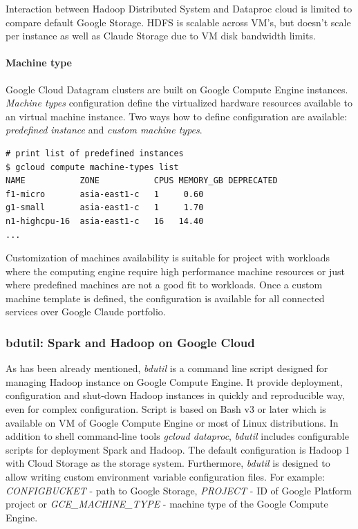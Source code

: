 \documentclass[a4paper,12pt,oneside]{report}
\begin{document}
Interaction between Hadoop Distributed System and Dataproc cloud is limited to compare default 
Google Storage. HDFS is scalable across VM’s, but doesn’t scale per instance as well as Claude Storage due to VM disk bandwidth limits. 

\paragraph{Machine type} Google Cloud Datagram clusters are built on Google Compute Engine instances.
\textit{Machine types} configuration define the virtualized hardware resources available to an 
virtual machine instance. Two ways how to define configuration are available: \textit{predefined instance} and \textit{custom machine types}.  

\begin{footnotesize}\begin{lstlisting}[style=mybash]
# print list of predefined instances
$ gcloud compute machine-types list
NAME           ZONE           CPUS MEMORY_GB DEPRECATED
f1-micro       asia-east1-c   1     0.60
g1-small       asia-east1-c   1     1.70
n1-highcpu-16  asia-east1-c   16   14.40
...
\end{lstlisting}\end{footnotesize}


Customization of machines availability is suitable for project with workloads where the computing 
engine require high performance machine resources or just where predefined machines are not a good 
fit to workloads. Once a custom machine template is 
defined, the configuration is available for all connected services over Google Claude portfolio.

\subsubsection{bdutil: Spark and Hadoop on Google Cloud}\label{subsub:bdutil}
As has been already mentioned, \textit{bdutil} is a command line script designed for
managing Hadoop instance on Google Compute Engine. It provide deployment, configuration
and shut-down Hadoop instances in quickly and reproducible way, even for complex configuration. 
Script is based on Bash v3 or later which is available on VM of Google Compute Engine or most of 
Linux distributions. In addition to shell command-line
tools \textit{gcloud dataproc}, \textit{bdutil} includes configurable scripts for deployment 
Spark and Hadoop. The default configuration is Hadoop 1 with Cloud Storage as the storage system. 
Furthermore, \textit{bdutil} is designed to allow writing custom environment variable configuration 
files. For example: \emph{CONFIGBUCKET} - path to Google Storage, \emph{PROJECT} - ID of Google Platform 
project or \emph{GCE\_MACHINE\_TYPE} - machine type of the Google Compute Engine.
\end{document}
